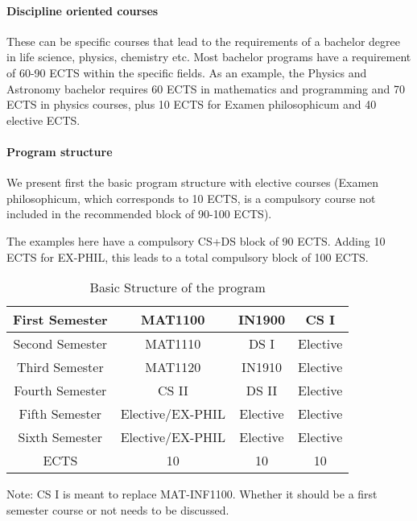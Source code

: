 \documentclass[oneside,final,10pt]{article}
\begin{document}
\paragraph{Discipline oriented courses}

These can be specific courses that lead to the requirements of a bachelor degree in life science, physics, chemistry etc. Most bachelor programs have a requirement of 60-90 ECTS within the specific fields. As an example, the Physics and Astronomy bachelor requires 60 ECTS in mathematics and programming and 70 ECTS in physics courses, plus 10 ECTS for Examen philosophicum and 40 elective ECTS.  



\paragraph{Program structure}
We present first the basic program structure with elective courses (Examen philosophicum, which corresponds to 10 ECTS, is a compulsory course not included in the recommended block of 90-100 ECTS).

The examples here have a compulsory CS+DS block of 90 ECTS. Adding 10 ECTS for EX-PHIL, this leads to a total compulsory block of 100 ECTS. 

\begin{table}[hbtp]
 \caption{Basic Structure of the program}
    \centering
    \begin{tabular}{|c|c|c|c|} \hline
    First Semester & MAT1100 &  IN1900   & CS I  \\ \hline 
    Second Semester & MAT1110 &  DS I   & Elective \\ \hline
    Third Semester & MAT1120 &  IN1910   &  Elective\\ \hline
    Fourth Semester & CS II & DS II    & Elective \\ \hline       
    Fifth Semester & Elective/EX-PHIL & Elective     & Elective \\ \hline
    Sixth Semester & Elective/EX-PHIL & Elective    & Elective \\ \hline
   ECTS & 10 &  10   &  10  \\ \hline    
    \end{tabular}
   
\end{table}

Note: CS I is meant to replace MAT-INF1100. Whether it should be a first semester course or not needs to be discussed. 
\end{document}
